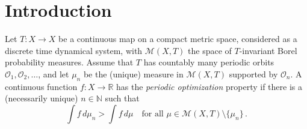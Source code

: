 \documentclass[reqno,11pt]{amsart}
\theoremstyle{definition}
\theoremstyle{remark}
\theoremstyle{remark}
\def \N {\mathbb N}
\def \R {\mathbb R}
\def\m{\mathcal M}
\def\o{\mathcal{O}}
\numberwithin{equation}{section}
\begin{document}
\maketitle



\setcounter{tocdepth}{1}
\tableofcontents

\section{ Introduction}\label{introsection}




Let $T:X\to X$ be a continuous map on a compact metric space, considered as a discrete time dynamical system,
with $\m(X,T)$ the space of $T$-invariant Borel probability measures.
Assume that $T$ has countably many periodic orbits
$\o_1,\o_2,\ldots$,
and let $\mu_n$ be the (unique) 
measure in $\m(X,T)$ supported by $\o_n$.
A continuous function $f:X\to\R$ has the \emph{periodic optimization} property if
there is a (necessarily unique) $n\in\N$ such that
\begin{equation}\label{periodicoptimization}
\int f\, d\mu_n > \int f\, d\mu\quad\text{for all }\mu\in\m(X,T)\setminus\{\mu_n\}\,.
\end{equation}
\end{document}
